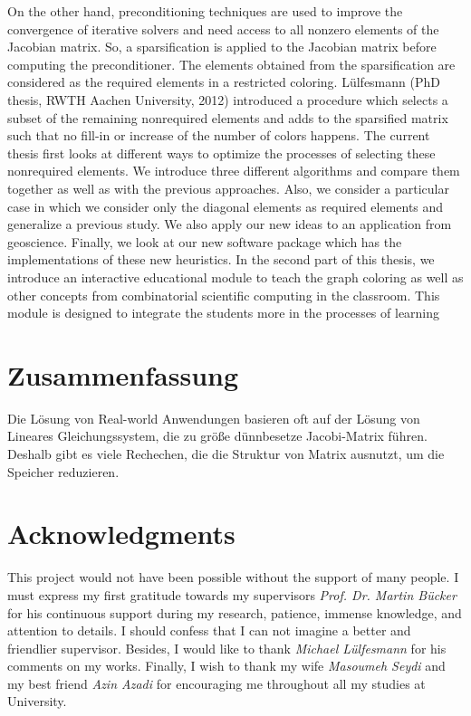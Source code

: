 \documentclass[12pt, twoside,a4paper,toc=bibliography]{scrbook}
\begin{document}
On the other hand, preconditioning techniques are used to
improve the convergence of iterative solvers and need access to all nonzero elements
of the Jacobian matrix.
So, a sparsification is applied to the Jacobian matrix before computing the preconditioner.
The elements obtained from the sparsification are considered as the required elements in a restricted coloring.
Lülfesmann (PhD thesis, RWTH Aachen University, 2012) introduced a procedure
which selects a subset of the remaining nonrequired elements and adds to the sparsified matrix
such that no fill-in or increase of the number of colors happens.
The current thesis first looks at different ways to optimize the processes of selecting these nonrequired elements.
We introduce three different algorithms and compare them together as well as with the previous approaches.
Also, we consider a particular case in which we consider only the diagonal elements as required elements
and generalize a previous study. We also apply our new ideas to an application from geoscience.
Finally, we look at our new software package which has the implementations of these new heuristics.
In the second part of this thesis, we introduce an interactive educational module to teach the
graph coloring as well as other concepts from combinatorial scientific computing in the classroom.
This module is designed to integrate the students more in the processes of learning

\chapter*{Zusammenfassung}
Die Lösung von Real-world Anwendungen basieren oft auf der Lösung von Lineares Gleichungssystem,
die zu größe dünnbesetze Jacobi-Matrix führen. Deshalb gibt es viele Rechechen, die
die Struktur von Matrix ausnutzt, um die Speicher reduzieren.


\chapter*{Acknowledgments}
\noindent This project would not have been possible without
the support of many people. I must express my first gratitude
towards my supervisors \textit{Prof. Dr. Martin B\"ucker} for his continuous
support during my research, patience, immense knowledge,
and attention to details.
I should confess that I can not imagine a better and friendlier supervisor.
Besides, I would like to thank \textit{Michael Lülfesmann} for his comments on my works.
Finally, I wish to thank my wife \textit{Masoumeh Seydi} and
my best friend \textit{Azin Azadi} for encouraging me throughout all my studies at University.
\end{document}

